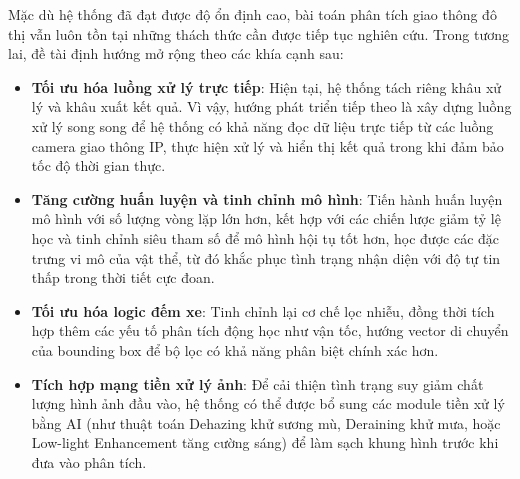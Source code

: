 Mặc dù hệ thống đã đạt được độ ổn định cao, bài toán phân tích giao thông đô thị vẫn luôn tồn tại những thách thức cần được tiếp tục nghiên cứu. Trong tương lai, đề tài định hướng mở rộng theo các khía cạnh sau:
\begin{itemize}
	\item \textbf{Tối ưu hóa luồng xử lý trực tiếp}: Hiện tại, hệ thống tách riêng khâu xử lý và khâu xuất kết quả. Vì vậy, hướng phát triển tiếp theo là xây dựng luồng xử lý song song để hệ thống có khả năng đọc dữ liệu trực tiếp từ các luồng camera giao thông IP, thực hiện xử lý và hiển thị kết quả trong khi đảm bảo tốc độ thời gian thực.
	
	\item \textbf{Tăng cường huấn luyện và tinh chỉnh mô hình}: Tiến hành huấn luyện mô hình với số lượng vòng lặp lớn hơn, kết hợp với các chiến lược giảm tỷ lệ học và tinh chỉnh siêu tham số để mô hình hội tụ tốt hơn, học được các đặc trưng vi mô của vật thể, từ đó khắc phục tình trạng nhận diện với độ tự tin thấp trong thời tiết cực đoan.
	
	\item \textbf{Tối ưu hóa logic đếm xe}: Tinh chỉnh lại cơ chế lọc nhiễu, đồng thời tích hợp thêm các yếu tố phân tích động học như vận tốc, hướng vector di chuyển của bounding box để bộ lọc có khả năng phân biệt chính xác hơn.
	
	\item \textbf{Tích hợp mạng tiền xử lý ảnh}: Để cải thiện tình trạng suy giảm chất lượng hình ảnh đầu vào, hệ thống có thể được bổ sung các module tiền xử lý bằng AI (như thuật toán Dehazing khử sương mù, Deraining khử mưa, hoặc Low-light Enhancement tăng cường sáng) để làm sạch khung hình trước khi đưa vào phân tích.
\end{itemize}